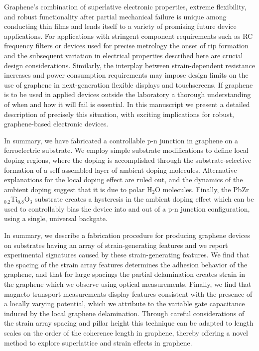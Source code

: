 \documentclass[edeposit,fullpage,draftthesis]{uiucthesis2009}
\begin{document}
            Graphene's combination of superlative electronic properties, extreme
            flexibility, and robust functionality after partial mechanical failure is
            unique among conducting thin films and lends itself to a variety of promising
            future device applications. For applications with stringent component
            requirements such as RC frequency filters or devices used for precise metrology
            the onset of rip formation and the subsequent variation in electrical
            properties described here are crucial design considerations. Similarly, the
            interplay between strain-dependent resistance increases and power consumption
            requirements may impose design limits on the use of graphene in next-generation
            flexible displays and touchscreens. If graphene is to be used in applied
            devices outside the laboratory a thorough understanding of when and how it will
            fail is essential. In this manuscript we present a detailed description of
            precisely this situation, with exciting implications for robust, graphene-based
            electronic devices.

            In summary, we have fabricated a controllable p-n junction in graphene on a ferroelectric 
            substrate. We employ simple substrate modifications to define local doping regions, where 
            the doping is accomplished through the substrate-selective formation of a self-assembled 
            layer of ambient doping molecules. Alternative explanations for the local doping effect 
            are ruled out, and the dynamics of the ambient doping suggest that it is due to polar 
            H$_2$O molecules. Finally, the PbZr$_{0.2}$Ti$_{0.8}$O$_3$ substrate creates a hysteresis 
            in the ambient doping effect which can be used to controllably bias the device into and 
            out of a p-n junction configuration, using a single, universal backgate.

            In summary, we describe a fabrication procedure for producing graphene devices on
            substrates having an array of strain-generating features and we report experimental signatures
            caused by these strain-generating features. We find that the spacing of the strain array features
            determines the adhesion behavior of the graphene, and that for large spacings the partial
            delamination creates strain in the graphene which we observe using optical measurements. 
            Finally, we find that magneto-transport measurements
            display features consistent with the presence of a locally varying potential, which we attribute to the 
            variable gate capacitance induced by the local graphene delamination. 
            Through careful considerations of the strain array spacing and pillar height
            this technique can be adapted to length scales on the order of the coherence length in
            graphene, thereby offering a novel method to explore superlattice and strain effects in graphene.
    
\end{document}
